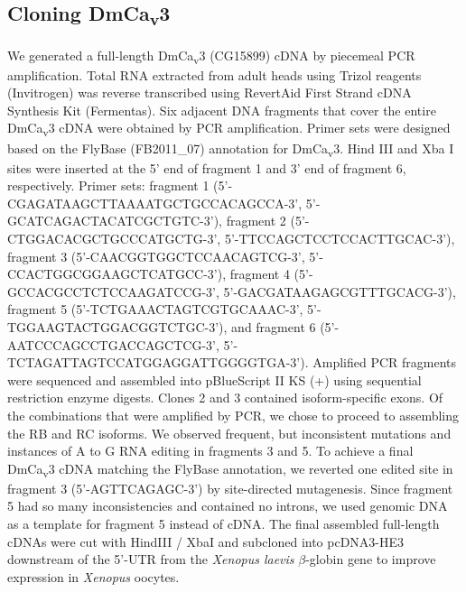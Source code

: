 \subsection*{Cloning DmCa\textsubscript{v}3}

We generated a full-length DmCa\textsubscript{v}3 (CG15899) cDNA by piecemeal PCR amplification.
Total RNA extracted from adult heads using Trizol reagents (Invitrogen) was reverse transcribed using RevertAid First Strand cDNA Synthesis Kit (Fermentas).
Six adjacent DNA fragments that cover the entire DmCa\textsubscript{v}3 cDNA were obtained by PCR amplification. 
Primer sets were designed based on the FlyBase (FB2011_07) annotation for DmCa\textsubscript{v}3. 
Hind III and Xba I sites were inserted at the 5' end of fragment 1 and 3' end of fragment 6, respectively.
Primer sets: fragment 1 (5'-CGAGATAAGCTTAAAATGCTGCCACAGCCA-3', 5'-GCATCAGACTACATCGCTGTC-3'), fragment 2 (5'-CTGGACACGCTGCCCATGCTG-3', 5'-TTCCAGCTCCTCCACTTGCAC-3'), fragment 3 (5'-CAACGGTGGCTCCAACAGTCG-3', 5'-CCACTGGCGGAAGCTCATGCC-3'), fragment 4 (5'-GCCACGCCTCTCCAAGATCCG-3', 5'-GACGATAAGAGCGTTTGCACG-3'), fragment 5 (5'-TCTGAAACTAGTCGTGCAAAC-3', 5'-TGGAAGTACTGGACGGTCTGC-3'), and fragment 6 (5'-AATCCCAGCCTGACCAGCTCG-3', 5'-TCTAGATTAGTCCATGGAGGATTGGGGTGA-3').
Amplified PCR fragments were sequenced and assembled into pBlueScript II KS (+) using sequential restriction enzyme digests.
Clones 2 and 3 contained isoform-specific exons.
Of the combinations that were amplified by PCR, we chose to proceed to assembling the RB and RC isoforms.
We observed frequent, but inconsistent mutations and instances of A to G RNA editing in fragments 3 and 5.
To achieve a final DmCa\textsubscript{v}3 cDNA matching the FlyBase annotation, we reverted one edited site in fragment 3 (5'-AGTTCAGAGC-3') by site-directed mutagenesis.
Since fragment 5 had so many inconsistencies and contained no introns, we used genomic DNA as a template for fragment 5 instead of cDNA.
The final assembled full-length cDNAs were cut with HindIII / XbaI and subcloned into pcDNA3-HE3 downstream of the 5'-UTR from the \emph{Xenopus laevis} $\beta$-globin gene to improve expression in \emph{Xenopus} oocytes.
